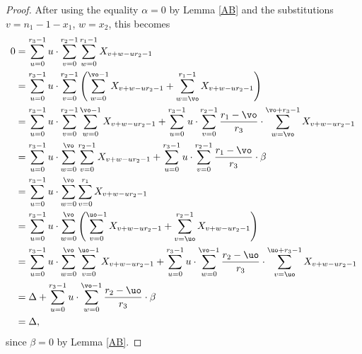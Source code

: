 \begin{proof}
After using the equality $\alpha=0$ by Lemma \ref{AB} and the substitutions $v=n_1-1-x_1$, $w=x_2$, this becomes
\begin{align*}
0&=\sum_{u=0}^{r_3-1}u\cdot \sum_{v=0}^{r_2-1}\sum _{w=0}^{r_1-1}X_{v+w-ur_2-1}\\
&=\sum_{u=0}^{r_3-1}u\cdot \sum_{v=0}^{r_2-1}\left(\sum _{w=0}^{\vo-1}X_{v+w-ur_2-1}+\sum _{w=\vo}^{r_1-1}X_{v+w-ur_2-1}\right)\\
&=\sum_{u=0}^{r_3-1}u\cdot \sum_{v=0}^{r_2-1}\sum _{w=0}^{\vo-1}X_{v+w-ur_2-1}+\sum_{u=0}^{r_3-1}u\cdot \sum_{v=0}^{r_2-1}\frac{r_1-\vo}{r_3}\cdot\sum _{w=\vo}^{\vo + r_3-1}X_{v+w-ur_2-1}\\
&=\sum_{u=0}^{r_3-1}u\cdot \sum _{w=0}^{\vo} \sum_{v=0}^{r_2-1} X_{v+w-ur_2-1}+\sum_{u=0}^{r_3-1}u\cdot \sum_{v=0}^{r_2-1}\frac{r_1-\vo}{r_3}\cdot \beta\\
&=\sum_{u=0}^{r_3-1}u\cdot \sum _{w=0}^{\vo} \sum_{v=0}^{r_1} X_{v+w-ur_2-1}\\
&=\sum_{u=0}^{r_3-1}u\cdot \sum _{w=0}^{\vo}\left( \sum_{v=0}^{\uo-1} X_{v+w-ur_2-1}+\sum_{v=\uo}^{r_2-1} X_{v+w-ur_2-1}\right)\\
&=\sum_{u=0}^{r_3-1}u\cdot \sum _{w=0}^{\vo} \sum_{v=0}^{\uo-1} X_{v+w-ur_2-1}+\sum_{u=0}^{r_3-1}u\cdot \sum _{w=0}^{\vo-1}\frac{r_2-\uo}{r_3}\cdot \sum_{v=\uo}^{\uo+r_3-1} X_{v+w-ur_2-1}\\
&=\Delta+\sum_{u=0}^{r_3-1}u\cdot \sum _{w=0}^{\vo-1}\frac{r_2-\uo}{r_3}\cdot \beta\\
&=\Delta,
\end{align*}
since $\beta=0$ by Lemma \ref{AB}.
\end{proof}

